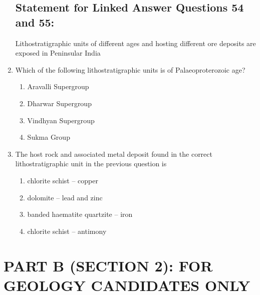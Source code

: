 \documentclass[journal,12pt,onecolumn]{IEEEtran}
\theoremstyle{remark}
\begin{document}
\begin{enumerate}
\subsection*{Statement for Linked Answer Questions 54 and 55: }  
\vspace{0.5cm}

Lithostratigraphic units of different ages and hosting different ore deposits are exposed in Peninsular India
\vspace{0.5cm}







\item Which of the following lithostratigraphic units is of Palaeoproterozoic age?
\begin{multicols}{2}
\begin{enumerate}
\item Aravalli Supergroup  
\item Dharwar Supergroup  
\item Vindhyan Supergroup  
\item Sukma Group  
\end{enumerate}
\end{multicols}

\item The host rock and associated metal deposit found in the correct lithostratigraphic unit in the previous question is
\begin{multicols}{2}
\begin{enumerate}
\item chlorite schist -- copper  
\item dolomite -- lead and zinc  
\item banded haematite quartzite -- iron  
\item chlorite schist -- antimony  
\end{enumerate}
\end{multicols}

\end{enumerate}
\newpage
\section*{\textbf{PART B (SECTION 2): FOR GEOLOGY CANDIDATES ONLY}}
\vspace{0.5cm}
\end{document}
